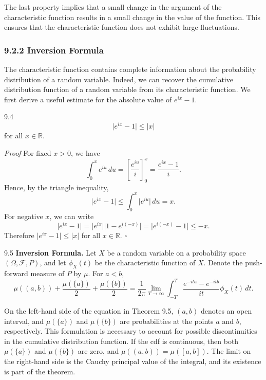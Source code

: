 The last property implies that a small change in the argument of the characteristic function results in a small change in the value of the function. This ensures that the characteristic function does not exhibit large fluctuations.

\subsubsection*{9.2.2 Inversion Formula}

The characteristic function contains complete information about the probability distribution of a random variable. Indeed, we can recover the cumulative distribution function of a random variable from its characteristic function. We first derive a useful estimate for the absolute value of $e^{ix}-1$.

\begin{thmbox}{9.4}
\[
\lvert e^{ix}-1\rvert\leq \lvert x\rvert
\]
for all $x\in\mathbb{R}$.
\end{thmbox}

\textit{Proof}
For fixed $x>0$, we have
\[
\int_0^x e^{iu}\,du
=\left[\frac{e^{iu}}{i}\right]_0^x
=\frac{e^{ix}-1}{i}.
\]
Hence, by the triangle inequality,
\[
\lvert e^{ix}-1\rvert\leq \int_0^x \lvert e^{iu}\rvert\,du=x.
\]
For negative $x$, we can write
\[
\lvert e^{ix}-1\rvert
=\lvert e^{ix}\rvert\lvert 1-e^{i(-x)}\rvert
=\lvert e^{i(-x)}-1\rvert
\leq -x.
\]
Therefore $\lvert e^{ix}-1\rvert\leq \lvert x\rvert$ for all $x\in\mathbb{R}$.
\hfill $\square$

\begin{thmbox}{9.5}
\textbf{Inversion Formula.}
Let $X$ be a random variable on a probability space $(\Omega,\mathcal{F},P)$, and let $\phi_X(t)$ be the characteristic function of $X$. Denote the push-forward measure of $P$ by $\mu$. For $a<b$,
\[
\mu((a,b))+\frac{\mu(\{a\})}{2}+\frac{\mu(\{b\})}{2}
=\frac{1}{2\pi}\lim_{T\to\infty}
\int_{-T}^{T}\frac{e^{-ita}-e^{-itb}}{it}\phi_X(t)\,dt.
\]
\end{thmbox}

On the left-hand side of the equation in Theorem 9.5, $(a,b)$ denotes an open interval, and $\mu(\{a\})$ and $\mu(\{b\})$ are probabilities at the points $a$ and $b$, respectively. This formulation is necessary to account for possible discontinuities in the cumulative distribution function. If the cdf is continuous, then both $\mu(\{a\})$ and $\mu(\{b\})$ are zero, and $\mu((a,b))=\mu([a,b])$. The limit on the right-hand side is the Cauchy principal value of the integral, and its existence is part of the theorem.

